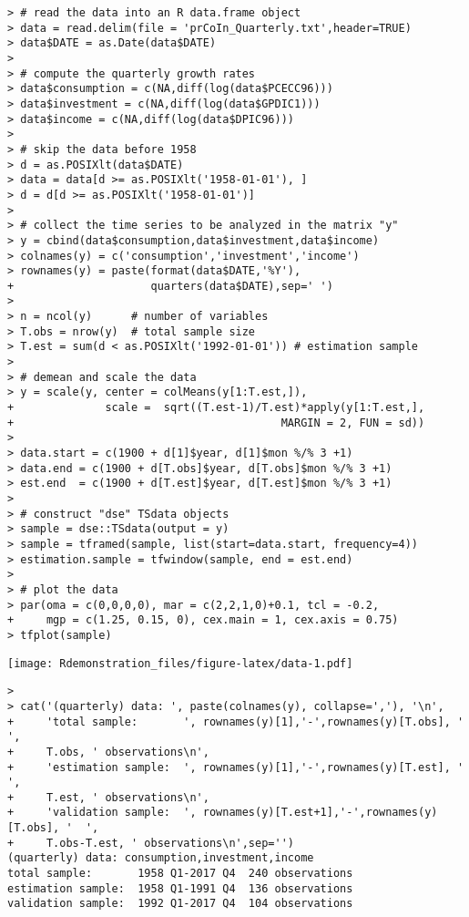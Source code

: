 \documentclass[]{article}
\begin{document}
\begin{verbatim}
> # read the data into an R data.frame object
> data = read.delim(file = 'prCoIn_Quarterly.txt',header=TRUE)
> data$DATE = as.Date(data$DATE)
> 
> # compute the quarterly growth rates 
> data$consumption = c(NA,diff(log(data$PCECC96)))
> data$investment = c(NA,diff(log(data$GPDIC1)))
> data$income = c(NA,diff(log(data$DPIC96)))
> 
> # skip the data before 1958
> d = as.POSIXlt(data$DATE)
> data = data[d >= as.POSIXlt('1958-01-01'), ]
> d = d[d >= as.POSIXlt('1958-01-01')]
> 
> # collect the time series to be analyzed in the matrix "y"
> y = cbind(data$consumption,data$investment,data$income)
> colnames(y) = c('consumption','investment','income')
> rownames(y) = paste(format(data$DATE,'%Y'),
+                     quarters(data$DATE),sep=' ')
> 
> n = ncol(y)      # number of variables 
> T.obs = nrow(y)  # total sample size
> T.est = sum(d < as.POSIXlt('1992-01-01')) # estimation sample
> 
> # demean and scale the data
> y = scale(y, center = colMeans(y[1:T.est,]), 
+              scale =  sqrt((T.est-1)/T.est)*apply(y[1:T.est,], 
+                                         MARGIN = 2, FUN = sd))
> 
> data.start = c(1900 + d[1]$year, d[1]$mon %/% 3 +1)
> data.end = c(1900 + d[T.obs]$year, d[T.obs]$mon %/% 3 +1)
> est.end  = c(1900 + d[T.est]$year, d[T.est]$mon %/% 3 +1)
> 
> # construct "dse" TSdata objects
> sample = dse::TSdata(output = y)
> sample = tframed(sample, list(start=data.start, frequency=4))
> estimation.sample = tfwindow(sample, end = est.end)
> 
> # plot the data
> par(oma = c(0,0,0,0), mar = c(2,2,1,0)+0.1, tcl = -0.2, 
+     mgp = c(1.25, 0.15, 0), cex.main = 1, cex.axis = 0.75)
> tfplot(sample)
\end{verbatim}

\texttt{[image: Rdemonstration\_files/figure-latex/data-1.pdf]}

\begin{verbatim}
> 
> cat('(quarterly) data: ', paste(colnames(y), collapse=','), '\n', 
+     'total sample:       ', rownames(y)[1],'-',rownames(y)[T.obs], '  ',
+     T.obs, ' observations\n',
+     'estimation sample:  ', rownames(y)[1],'-',rownames(y)[T.est], '  ', 
+     T.est, ' observations\n',
+     'validation sample:  ', rownames(y)[T.est+1],'-',rownames(y)[T.obs], '  ', 
+     T.obs-T.est, ' observations\n',sep='')
(quarterly) data: consumption,investment,income
total sample:       1958 Q1-2017 Q4  240 observations
estimation sample:  1958 Q1-1991 Q4  136 observations
validation sample:  1992 Q1-2017 Q4  104 observations
\end{verbatim}
\end{document}

